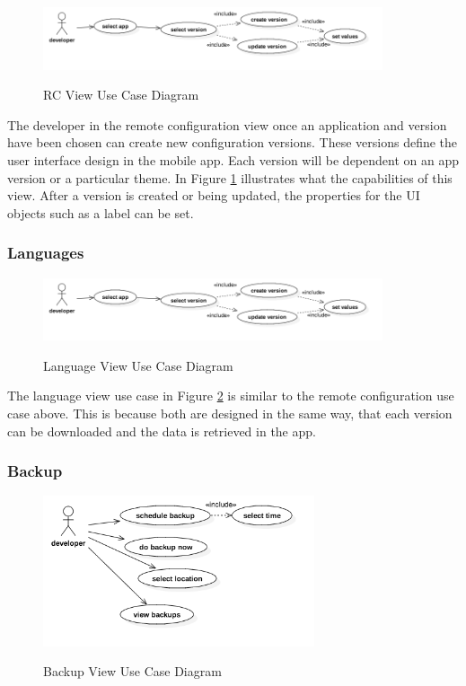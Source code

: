 \begin{figure}[!h]
    \caption{RC View Use Case Diagram}
    \centering
    \includegraphics[width=100mm]{images/use_cases/rc_uc}
    \label{fig:rc_uc}
\end{figure}
 
The developer in the remote configuration view once an application and version have been chosen can create new configuration versions. These versions define the user interface design in the mobile app. Each version will be dependent on an app version or a particular theme. In Figure \ref{fig:rc_uc} illustrates what the capabilities of this view. After a version is created or being updated, the properties for the UI objects such as a label can be set.
 
\subsubsection{Languages} \label{d-db:languages}

\begin{figure}[!h]
    \caption{Language View Use Case Diagram}
    \centering
    \includegraphics[width=100mm]{images/use_cases/rc_uc}
    \label{fig:language_uc}
\end{figure}

The language view use case in Figure \ref{fig:language_uc} is similar to the remote configuration use case above. This is because both are designed in the same way, that each version can be downloaded and the data is retrieved in the app.

\subsubsection{Backup} \label{d-db:backup}

\begin{figure}[!h]
    \caption{Backup View Use Case Diagram}
    \centering
    \includegraphics[width=80mm]{images/use_cases/backup_uc}
    \label{fig:backup_uc}
\end{figure}

